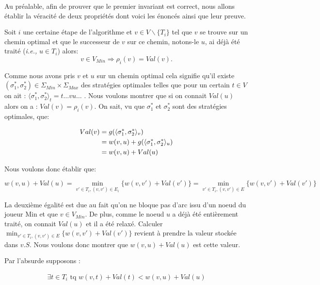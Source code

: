 Au préalable, afin de prouver que le premier invariant est correct, nous allons établir la véracité de deux propriétés dont voici les énoncés ainsi que leur preuve.

\setcounter{equation}{0}

\begin{propriete}
	\label{prop:dijk1}
	Soit $i$ une certaine étape de l'algorithme et $v \in V\backslash \{ T_i \}$ tel que $v$ se trouve sur un chemin optimal et que le successeur de $v$ sur ce chemin, notons-le $u$, ai déjà été traité (\emph{i.e.,} $u \in T_i$) alors:
	$$ v \in V_{Min} \Rightarrow \rho_i(v) = Val(v).$$
\end{propriete}

\begin{demonstration}
$\text{}$\\
	Comme nous avons pris $v$ et $u$ sur un chemin optimal cela signifie qu'il existe $(\sigma_1^*, \sigma_2^*) \in \Sigma_{Min} \times \Sigma_{Max}$ des stratégies optimales telles que pour un certain $t \in V$ on ait : $\langle \sigma_1^*, \sigma_2^* \rangle_t = t\ldots vu\ldots$ .
Nous voulons montrer que si on connait $Val(u)$ alors on a : $Val(v) = \rho_i(v)$.
On sait, vu que $\sigma_1^*$ et $ \sigma_2^*$ sont des stratégies optimales, que:

\begin{align*}
Val(v) &= g(\langle \sigma_1^*,\sigma_2^* \rangle_v) \notag \\
 	   &= w(v,u) + g(\langle \sigma_1^*,\sigma_2^* \rangle_u) \notag \\
       &= w(v,u) + Val(u) 
\end{align*}

Nous voulons donc établir que:

$$ w(v,u) + Val(u) = \min_{v' \in T_i, (v,v') \in E_i} \{ w(v,v') + Val(v') \} = \min_{v' \in T_i, (v,v') \in E} \{ w(v,v') + Val(v') \}$$

La deuxième égalité est due au fait qu'on ne bloque pas d'arc issu d'un noeud du joueur Min et que $v\in V_{Min}$.
De plus, comme le noeud $u$ a déjà été entièrement traité, on connait $Val(u)$ et il a été relaxé. Calculer $\min_{v' \in T_i, (v,v') \in E} \{ w(v,v') + Val(v') \}$ revient à prendre la valeur stockée dans $v.S$. Nous voulons donc montrer que $w(v,u) + Val(u)$ est cette valeur.

Par l'absurde supposons :

\begin{align} \exists t \in T_i \text{ tq } w(v,t) + Val(t) < w(v,u) + Val(u) \label{eq:dijk1} \end{align}


\end{demonstration}
